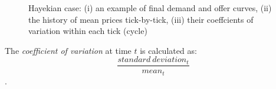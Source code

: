 \documentclass[12pt]{report}
\begin{document}
\begin{figure}[htbp]
\begin{center}
\caption{Hayekian case: (i) an example of final demand and offer curves, (ii) the history of mean prices tick-by-tick, (iii) their coeffcients of variation within each tick (cycle)}
\label{output_3_1.png}
\end{center}
\end{figure}

The \emph{coefficient of variation} at time $t$ is calculated as: $$\frac{standard~deviation_t}{mean_t}$$.
\end{document}
